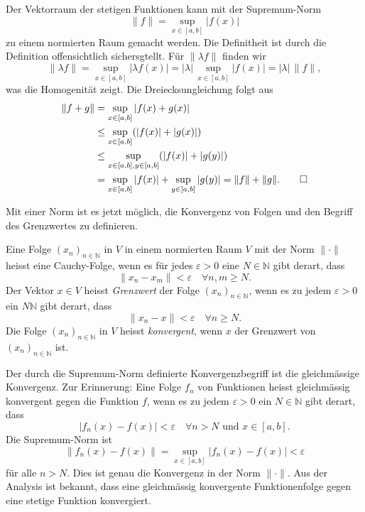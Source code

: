 \begin{beispiel}
Der Vektorraum der stetigen Funktionen kann mit der Supremum-Norm
\[
\|f\| = \sup_{x\in[a,b]} |f(x)|
\]
zu einem normierten Raum gemacht werden.
Die Definitheit ist durch die Definition offensichtlich sichersgtellt.
Für $\|\lambda f\|$ finden wir
\[
\|\lambda f\|
=
\sup_{x\in[a,b]} |\lambda f(x)|
=
|\lambda|\,
\sup_{x\in[a,b]} |f(x)|
=
|\lambda|\, \|f\|,
\]
was die Homogenität zeigt.
Die Dreiecksungleichung folgt aus
\begin{align*}
\|f+g\|
&=
\sup_{x\in[a,b]} |f(x)+g(x)|
\\
&\le
\sup_{x\in[a,b]} (|f(x)|+|g(x)|)
\\
&\le
\sup_{x\in[a,b], y\in[a,b]} (|f(x)|+|g(y)|)
\\
&=
\sup_{x\in[a,b]} |f(x)|
+
\sup_{y\in[a,b]} |g(y)|
=
\|f\| + \|g\|.
\qedhere
\end{align*}
\end{beispiel}

Mit einer Norm ist es jetzt möglich, die Konvergenz von Folgen und den
Begriff des Grenzwertes zu definieren.

\begin{definition}
Eine Folge $(x_n)_{n\in\mathbb{N}}$ in $V$ in einem normierten Raum $V$
mit der Norm $\|\cdot\|$
heisst eine Cauchy-Folge, wenn es für jedes $\varepsilon>0$ eine
%
$N\in \mathbb{N}$ gibt derart, dass
\[
\| x_n - x_m \| < \varepsilon
\quad\forall n,m\ge N.
\]
Der Vektor $x\in V$ heisst {\em Grenzwert} der Folge $(x_n)_{n\in\mathbb{N}}$,
%
wenn es zu jedem $\varepsilon > 0$ ein $N\mathbb{N}$ gibt derart, dass
\[
\|x_n-x\| < \varepsilon 
\quad\forall n\ge N.
\]
Die Folge $(x_n)_{n\in\mathbb{N}}$  in $V$ heisst {\em konvergent}, wenn
%
$x$ der Grenzwert von $(x_n)_{n\in\mathbb{N}}$ ist.
\end{definition}

Der durch die Supremum-Norm definierte Konvergenzbegriff ist die gleichmässige
Konvergenz.
Zur Erinnerung:
Eine Folge $f_n$ von Funktionen heisst gleichmässig konvergent gegen die
Funktion $f$, wenn es zu jedem
$\varepsilon >0$ ein $N\in\mathbb{N}$ gibt derart, dass
\[
|f_n(x) - f(x)|<\varepsilon\quad\forall n>N\text{ und }x\in [a,b].
\]
Die Supremum-Norm ist
\[
\|f_n(x) - f(x)\|
=
\sup_{x\in[a,b]} |f_n(x)-f(x)| < \varepsilon
\]
für alle $n>N$.
Dies ist genau die Konvergenz in der Norm $\|\cdot\|$.
Aus der Analysis ist bekannt, dass eine gleichmässig konvergente 
Funktionenfolge gegen eine stetige Funktion konvergiert.


